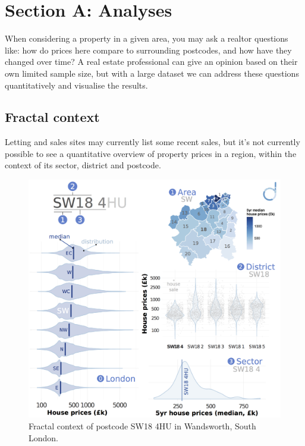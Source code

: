 \documentclass[
10pt, %
a4paper, %
oneside, %
headinclude,footinclude, %
BCOR5mm, %
]{scrartcl}
\begin{document}



\vspace{-1em}
\section*{Section A: Analyses}

When considering a property in a given area, you may ask a realtor
questions like: how do prices here compare to surrounding postcodes, and
how have they changed over time? A real estate professional can
give an opinion based on their own limited sample size, but with a
large dataset we can address these questions quantitatively and
visualise the results.

\vspace{-.5em}
\subsection*{Fractal context}

Letting and sales sites may currently list some recent sales, but it's
not currently possible to see a quantitative overview of property
prices in a region, within the context of its sector, district and
postcode.

\begin{figure}
\vspace{.5em}
\centering
\includegraphics[width=.43\textwidth]{Figures/fractal.png}
\caption{ Fractal context of postcode SW18 4HU in Wandsworth, South London.}
\end{figure}
\end{document}
